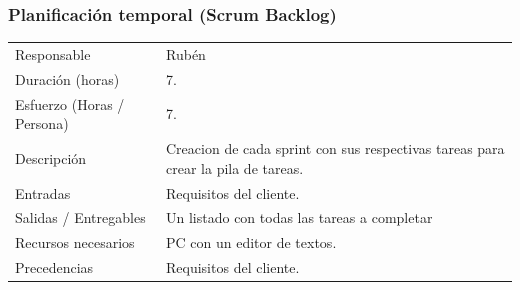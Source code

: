 \subsubsection{Planificaci\'{o}n temporal (Scrum Backlog)}
\begin{table}[H]
    \begin{center}
        \begin{tabular}{l p{8cm}}
            Responsable                           & Rub\'{e}n \\
            Duraci\'{o}n (horas)                  & 7. \\ 
            Esfuerzo (Horas / Persona)            & 7. \\
            Descripci\'{o}n                       & Creacion de cada sprint con sus respectivas tareas para crear la pila de tareas. \\
            Entradas                              & Requisitos del cliente.\\
            Salidas / Entregables                 & Un listado con todas las tareas a completar \\
            Recursos necesarios                   & PC con un editor de textos.\\
            Precedencias                          & Requisitos del cliente. \\
        \end{tabular}
    \end{center}
    
\end{table}

